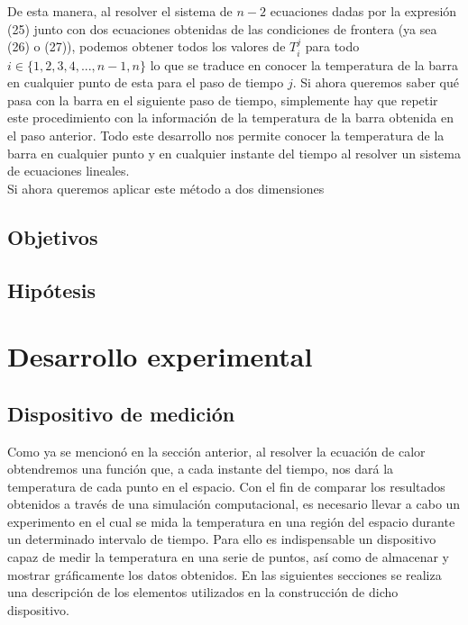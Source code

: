 \documentclass[12pt]{article}
\begin{document}
De esta manera, al resolver el sistema de $n-2$ ecuaciones dadas por la expresión (25) junto con dos ecuaciones obtenidas de las condiciones de frontera (ya sea (26) o (27)), podemos obtener todos los valores de $T_i^j$ para todo $i \in \{1,2,3,4,...,n-1,n\}$ lo que se traduce en conocer la temperatura de la barra en cualquier punto de esta para el paso de tiempo $j$. Si ahora queremos saber qué pasa con la barra en el siguiente paso de tiempo, simplemente hay que repetir este procedimiento con la información de la temperatura de la barra obtenida en el paso anterior. Todo este desarrollo nos permite conocer la temperatura de la barra en cualquier punto y en cualquier instante del tiempo al resolver un sistema de ecuaciones lineales. \\



Si ahora queremos aplicar este método a dos dimensiones 

\subsection{Objetivos}
\subsection{Hipótesis}

\section{Desarrollo experimental}

\newpage

\subsection{Dispositivo de medición}

Como ya se mencionó en la sección anterior, al resolver la ecuación de calor obtendremos una función que, a cada instante del tiempo, nos dará la temperatura de cada punto en el espacio. Con el fin de comparar los resultados obtenidos a través de una simulación computacional, es necesario llevar a cabo un experimento en el cual se mida la temperatura en una región del espacio durante un determinado intervalo de tiempo. Para ello es indispensable un dispositivo capaz de medir la temperatura en una serie de puntos, así como de almacenar y mostrar gráficamente los datos obtenidos. En las siguientes secciones se realiza una descripción de los elementos utilizados en la construcción de dicho dispositivo.
\end{document}

